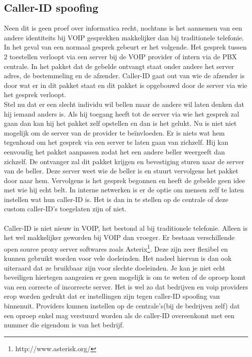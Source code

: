 \documentclass[pdftex,a4paper,12pt,twoside]{report}
\begin{document}
\subsection{Caller-ID spoofing}
Neen dit is geen proef over informatica recht, nochtans is het aannemen van een andere identiteits bij VOIP gesprekken makkelijker dan bij traditionele telefonie. In het geval van een normaal gesprek gebeurt er het volgende. Het gesprek tussen 2 toestellen verloopt via een server bij de VOIP provider of intern via de PBX centrale. In het pakket dat de gebelde ontvangt staat onder andere het server adres, de bestemmeling en de afzender. Caller-ID gaat out van wie de afzender is door wat er in dit pakket staat en dit pakket is opgebouwd door de server via wie het gesprek verloopt.\\
Stel nu dat er een slecht individu wil bellen maar de andere wil laten denken dat hij iemand anders is. Als hij toegang heeft tot de server via wie het gesprek zal gaan dan kan hij het pakket zelf opstellen en dan is het gelukt. Nu is niet niet mogelijk om de server van de provider te beïnvloeden. Er is niets wat hem tegenhoud om het gesprek via een server te laten gaan van zichzelf. Hij kan eenvoudig het pakket aanpassen zodat het een andere beller weergeeft dan zichzelf. De ontvanger zal dit pakket krijgen en bevestiging sturen naar de server van de beller. Deze server weet wie de beller is en stuurt vervolgens het pakket door naar hem. Vervolgens is het gesprek begonnen en heeft de gebelde geen idee met wie hij echt belt. In interne netwerken is er de optie om mensen zelf te laten instellen wat hun caller-ID is. Het is dan in te stellen op de centrale of deze custom caller-ID's toegelaten zijn of niet.
\\ \\
Caller-ID is niet nieuw in VOIP, het bestond al bij traditionele telefonie. Alleen is het wel makkelijker geworden bij VOIP dan vroeger. Er bestaan verschillende open source proxy server softwares zoals Asterix\footnote{http://www.asterisk.org/}. Deze zijn zeer flexibel en kunnen gebruikt worden voor vele doeleinden. Het nadeel hiervan is dan ook uiteraard dat ze bruikbaar zijn voor slechte doeleinden. 
\newpage
Je kan je niet echt beveiligen hiertegen aangezien er geen mogelijk is om te weten of de oproep komt van een correcte of incorrecte server. Het is wel zo dat bedrijven en voip providers erop worden gedrukt dat er instellingen zijn tegen caller-ID spoofing van binnenuit. Providers kunnen instellen op de centrale's(bij de bedrijven zelf) dat een oproep enkel mag verstuurd worden als de caller-ID overeenkomt met een nummer die eigendom is van het bedrijf.
\end{document}
